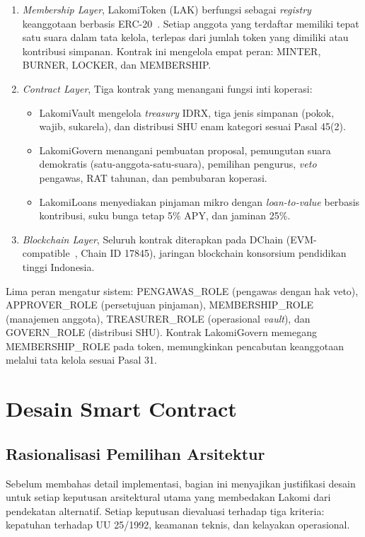 \begin{enumerate}
	\item \textit{Membership Layer}, LakomiToken (LAK) berfungsi sebagai \textit{registry} keanggotaan berbasis ERC-20~\cite{eip20}. Setiap anggota yang terdaftar memiliki tepat satu suara dalam tata kelola, terlepas dari jumlah token yang dimiliki atau kontribusi simpanan. Kontrak ini mengelola empat peran: MINTER, BURNER, LOCKER, dan MEMBERSHIP.
	\item \textit{Contract Layer}, Tiga kontrak yang menangani fungsi inti koperasi:
	\begin{itemize}
		\item LakomiVault mengelola \textit{treasury} IDRX, tiga jenis simpanan (pokok, wajib, sukarela), dan distribusi SHU enam kategori sesuai Pasal 45(2).
		\item LakomiGovern menangani pembuatan proposal, pemungutan suara demokratis (satu-anggota-satu-suara), pemilihan pengurus, \textit{veto} pengawas, RAT tahunan, dan pembubaran koperasi.
		\item LakomiLoans menyediakan pinjaman mikro dengan \textit{loan-to-value} berbasis kontribusi, suku bunga tetap 5\% APY, dan jaminan 25\%.
	\end{itemize}
	\item \textit{Blockchain Layer}, Seluruh kontrak diterapkan pada DChain (EVM-compatible~\cite{wood2014ethereum}, Chain ID 17845), jaringan blockchain konsorsium pendidikan tinggi Indonesia.
\end{enumerate}

Lima peran mengatur sistem: PENGAWAS\_ROLE (pengawas dengan hak veto), APPROVER\_ROLE (persetujuan pinjaman), MEMBERSHIP\_ROLE (manajemen anggota), TREASURER\_ROLE (operasional \textit{vault}), dan GOVERN\_ROLE (distribusi SHU). Kontrak LakomiGovern memegang MEMBERSHIP\_ROLE pada token, memungkinkan pencabutan keanggotaan melalui tata kelola sesuai Pasal 31.

\section{Desain Smart Contract}

\subsection{Rasionalisasi Pemilihan Arsitektur}

Sebelum membahas detail implementasi, bagian ini menyajikan justifikasi desain untuk setiap keputusan arsitektural utama yang membedakan Lakomi dari pendekatan alternatif. Setiap keputusan dievaluasi terhadap tiga kriteria: kepatuhan terhadap UU 25/1992, keamanan teknis, dan kelayakan operasional.


